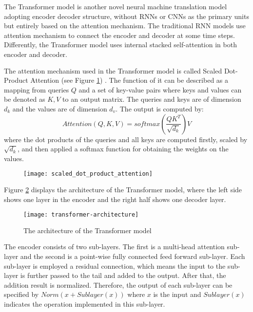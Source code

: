 The Transformer model \cite{Vaswani2017} is another novel neural machine translation model adopting encoder decoder structure, without RNNs or CNNs as the primary units but entirely based on the attention mechanism. The traditional RNN models use attention mechanism to connect the encoder and decoder at some time steps. Differently, the Transformer model uses internal stacked self-attention in both encoder and decoder.

The attention mechanism used in the Transformer model is called Scaled Dot-Product Attention (see Figure \ref{figure:scaled dot-product attention}) \cite{Vaswani2017}. The function of it can be described as a mapping from queries $ Q $ and a set of key-value pairs where keys and values can be denoted as $ K, V $ to an output matrix. The queries and keys are of dimension $ d_{k} $ and the values are of dimension $ d_{v} $. The output is computed by:
\[ Attention(Q,K,V) = softmax(\frac{QK^{T}}{\sqrt{d_{k}}})V \]
where the dot products of the queries and all keys are computed firstly, scaled by $ \sqrt{d_{k}} $, and then applied a softmax function for obtaining the weights on the values.

\begin{figure}[h]
\texttt{[image: scaled\_dot\_product\_attention]}
\centering
\caption{}
\label{figure:scaled dot-product attention}
\end{figure}

Figure \ref{figure:transformer model} displays the architecture of the Transformer model, where the left side shows one layer in the encoder and the right half shows one decoder layer.

\begin{figure}[h]
\texttt{[image: transformer-architecture]}
\centering
\caption{The architecture of the Transformer model \cite{Vaswani2017}}
\label{figure:transformer model}
\end{figure}

The encoder consists of two sub-layers. The first is a multi-head attention sub-layer and the second is a point-wise fully connected feed forward sub-layer. Each sub-layer is employed a residual connection, which means the input to the sub-layer is further passed to the tail and added to the output. After that, the addition result is normalized. Therefore, the output of each sub-layer can be specified by $ Norm(x+Sublayer(x)) $ where $ x $ is the input and $ Sublayer(x) $ indicates the operation implemented in this sub-layer.



